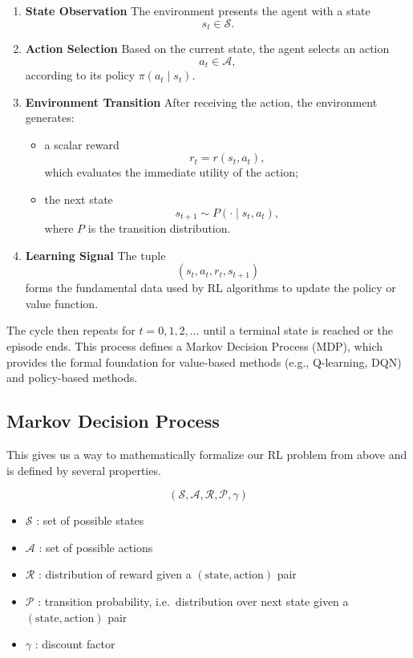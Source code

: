 \documentclass[11pt]{article}
\begin{document}
\begin{enumerate}
    \item \textbf{State Observation}  
    The environment presents the agent with a state
    \[
        s_t \in \mathcal{S}.
    \]

    \item \textbf{Action Selection}  
    Based on the current state, the agent selects an action
    \[
        a_t \in \mathcal{A},
    \]
    according to its policy $\pi(a_t \mid s_t)$.

    \item \textbf{Environment Transition}  
    After receiving the action, the environment generates:
    \begin{itemize}
        \item a scalar reward
        \[
            r_t = r(s_t, a_t),
        \]
        which evaluates the immediate utility of the action;
        \item the next state
        \[
            s_{t+1} \sim P(\cdot \mid s_t, a_t),
        \]
        where $P$ is the transition distribution.
    \end{itemize}

    \item \textbf{Learning Signal}  
    The tuple
    \[
        (s_t, a_t, r_t, s_{t+1})
    \]
    forms the fundamental data used by RL algorithms to update the policy or value function.
\end{enumerate}

The cycle then repeats for $t = 0, 1, 2, \ldots$ until a terminal state is reached or the episode ends.
This process defines a Markov Decision Process (MDP), which provides the formal foundation for  
value-based methods (e.g., Q-learning, DQN) and policy-based methods.


\subsection*{Markov Decision Process}

This gives us a way to mathematically formalize our RL problem from above and is defined by several properties.

\[
(\mathcal{S}, \mathcal{A}, \mathcal{R}, \mathcal{P}, \gamma)
\]

\begin{itemize}
    \item $\mathcal{S}$ : set of possible states
    \item $\mathcal{A}$ : set of possible actions
    \item $\mathcal{R}$ : distribution of reward given a \((\text{state}, \text{action})\) pair
    \item $\mathcal{P}$ : transition probability, i.e.\ distribution over next state given a \((\text{state}, \text{action})\) pair
    \item $\gamma$ : discount factor
\end{itemize}
\end{document}
